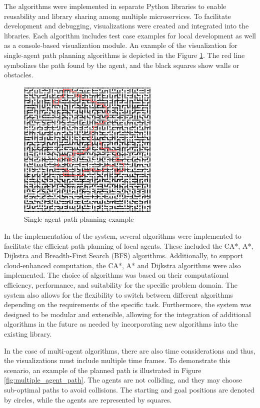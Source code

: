 The algorithms were implemented in separate Python libraries to enable reusability and library sharing among multiple microservices.  To facilitate development and debugging, visualizations were created and integrated into the libraries. Each algorithm includes test case examples for local development as well as a console-based visualization module. An example of the visualization for single-agent path planning algorithms is depicted in the Figure \ref{fig:single_agent_path}. The red line symbolizes the path found by the agent, and the black squares show walls or obstacles.

\begin{figure}[H]
    \centering
    \includegraphics[width=0.6\textwidth]{pictures/single_path_maze.png}
    \caption{Single agent path planning example} 
    \label{fig:single_agent_path}
\end{figure}

In the implementation of the system, several algorithms were implemented to facilitate the efficient path planning of local agents. These included the CA*, A*, Dijkstra and Breadth-First Search (BFS) algorithms. Additionally, to support cloud-enhanced computation, the CA*, A* and Dijkstra algorithms were also implemented. The choice of algorithms was based on their computational efficiency, performance, and suitability for the specific problem domain. The system also allows for the flexibility to switch between different algorithms depending on the requirements of the specific task. Furthermore, the system was designed to be modular and extensible, allowing for the integration of additional algorithms in the future as needed by incorporating new algorithms into the existing library.

In the case of multi-agent algorithms, there are also time considerations and thus, the visualizations must include multiple time frames. To demonstrate this scenario, an example of the planned path is illustrated in Figure \ref{fig:multiple_agent_path}. The agents are not colliding, and they may choose sub-optimal paths to avoid collisions. The starting and goal positions are denoted by circles, while the agents are represented by squares.

